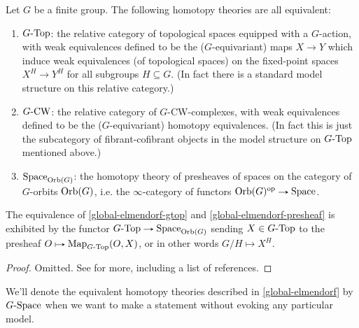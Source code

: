 \begin{theorem}[Elmendorf]
  \label{global-elmendorf}
  Let $G$ be a finite group. The following homotopy theories are all
  equivalent:
  \begin{enumerate}
  \item \label{global-elmendorf-gtop} $G\text{-}\mathrm{Top}$: the relative
    category of topological spaces equipped with a $G$-action, with
    weak equivalences defined to be the ($G$-equivariant) maps
    $X \to Y$ which induce weak equivalences (of topological spaces)
    on the fixed-point spaces $X^H \to Y^H$ for all subgroups
    $H \subseteq G$. (In fact there is a standard model structure on
    this relative category.)
  \item \label{global-elmendorf-gcw} $G\text{-}\mathrm{CW}$: the relative
    category of $G$-CW-complexes, with weak equivalences defined to be
    the ($G$-equivariant) homotopy equivalences. (In fact this is just
    the subcategory of fibrant-cofibrant objects in the model
    structure on $G\text{-}\mathrm{Top}$ mentioned above.)
  \item \label{global-elmendorf-presheaf} $\mathrm{Space}_{\mathrm{Orb}(G)}$: the
    homotopy theory of presheaves of spaces on the category of
    $G$-orbits $\mathrm{Orb}(G)$, i.e. the $\infty$-category of functors
    $\Orb(G)^\op \to \Space$.
  \end{enumerate}
  The equivalence of \cref{global-elmendorf-gtop} and
  \cref{global-elmendorf-presheaf} is exhibited by the functor
  $G\dash\Top \to \Space_{\Orb(G)}$ sending $X \in G\text{-}\mathrm{Top}$ to the
  presheaf $O \mapsto \Map_{G\dash\Top}(O,X)$, or in other words
  $G/H \mapsto X^H$.
\end{theorem}

\begin{proof}
  Omitted. See \cite{nlab-equivhomotopy} for more, including a list of
  references.
\end{proof}

\begin{notation}
  \label{global-gspace}
  We'll denote the equivalent homotopy theories described in
  \cref{global-elmendorf} by $G\text{-}\mathrm{Space}$ when we want to make a
  statement without evoking any particular model.
\end{notation}

